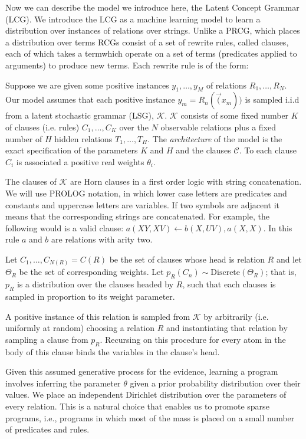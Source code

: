 \documentclass[11pt, twocolumn]{article}
\begin{document}
Now we can describe the model we introduce here, the Latent Concept
Grammar (LCG). We introduce the LCG as a machine learning model to
learn a distribution over instances of relations over strings. Unlike
a PRCG, which places a distribution over terms RCGs consist of a set
of rewrite rules, called clauses, each of which takes a termwhich
operate on a set of terms (predicates applied to arguments) to produce
new terms. Each rewrite rule is of the form:

Suppose we are given some positive instances $y_1, \dots,
y_M$ of relations $R_1, \dots, R_N$. Our model assumes that each
positive instance $y_m=R_n(\vec(x_m))$ is sampled i.i.d from a latent
stochastic grammar (LSG), $\mathcal{K}$. $\mathcal{K}$ consists of
some fixed number $K$ of clauses (i.e. rules) $C_1, \dots, C_K$ over
the $N$ observable relations plus a fixed number of $H$ hidden
relations $T_1, \dots, T_H$. The \emph{architecture} of the model is
the exact specification of the parameters $K$ and $H$ and the clauses
$\mathcal{C}$. To each clause $C_i$ is associated a positive real
weights $\theta_i$.

The clauses of $\mathcal{K}$ are Horn clauses in a first order logic
with string concatenation. We will use PROLOG notation, in which lower
case letters are predicates and constants and uppercase letters are
variables. If two symbols are adjacent it means that the corresponding
strings are concatenated. For example, the following would is a valid
clause: $a(XY, XV) \leftarrow b(X, UV), a(X, X)$. In this rule $a$ and
$b$ are relations with arity two.

Let $C_1, \dots, C_{N(R)} = C(R)$ be the set of clauses whose head is
relation $R$ and let $\Theta_R$ be the set of corresponding
weights. Let $p_R(C_n) \sim \text{Discrete}(\Theta_R)$; that is, $p_R$
is a distribution over the clauses headed by $R$, such that each
clauses is sampled in proportion to its weight parameter.

A positive instance of this relation is sampled from $\mathcal{K}$ by
arbitrarily (i.e. uniformly at random) choosing a relation $R$ and
instantiating that relation by sampling a clause from $p_R$. Recursing
on this procedure for every atom in the body of this clause binds the
variables in the clause's head. 

Given this assumed generative process for the evidence, learning a
program involves inferring the parameter $\theta$ given a prior
probability distribution over their values. We place an independent
Dirichlet distribution over the parameters of every relation. This is
a natural choice that enables us to promote sparse programs, i.e.,
programs in which most of the mass is placed on a small number of
predicates and rules.
\end{document}
